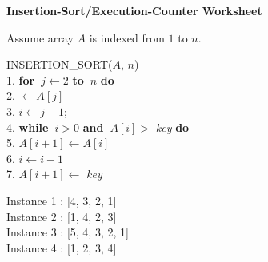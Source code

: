\documentclass[12pt]{article}
\begin{document}
\newcommand{\I}{\mbox{{\em Int}}}
\newcommand{\lt}{\mbox{{\em left}}}
\newcommand{\rt}{\mbox{{\em right}}}
\newcommand{\ld}{\Delta^l}
\newcommand{\rd}{\Delta^r}
\newcommand{\lsp}[1]{\large\renewcommand{\baselinestretch}{#1}\normalsize}
\newcommand{\hsp}{\hspace{.2in}}

\def\Endwhile{\mbox{\bf endwhile\ }}
\def\Or{\mbox{\bf or\ }}
\def\Do{\mbox{\bf do\ }}
\def\Downto{\mbox{\bf downto\ }}
\def\Int{\mbox{\bf int\ }}
\def\To{\mbox{\bf to\ }}
\def\Repeat{\mbox{\bf repeat\ }}
\def\Until{\mbox{\bf until\ }}
\def\Return{\mbox{\bf return\ }}
\def\Not{\mbox{\bf not\ }}
\def\And{\mbox{\bf and\ }}
\def\For{\mbox{\bf for\ }}
\def\Foreach{\mbox{\bf foreach\ }}
\def\Else{\mbox{\bf else\ }}
\def\Elseif{\mbox{\bf elseif\ }}
\def\End{\mbox{\bf end\ }}
\def\If{\mbox{\bf if\ }}
\def\Mod{\mbox{\bf \ mod\ }}
\def\Then{\mbox{\bf then\ }}
\def\While{\mbox{\bf while\ }}
\def\Output{\mbox{\bf output\ }}


\lsp{1}
\pagestyle{plain}
\begin{center}
    {\bf
        Insertion-Sort/Execution-Counter Worksheet
    }
\end{center}

Assume array $A$ is indexed from $1$ to $n$.

\noindent
INSERTION\_SORT($A$, $n$)\\
1. \For $j \leftarrow 2$ \To $n$ \Do\\
2. \indent {} $\leftarrow A[j]$\\
3. \indent \indent $i \leftarrow j-1$;\\
4. \indent \indent \While $i > 0$ \And $A[i] >$ {\em key} \Do\\
5. \indent \indent \indent \indent $A[i+1] \leftarrow A[i]$\\
6. \indent \indent \indent \indent $i \leftarrow i-1$\\
7. \indent \indent $A[i+1] \leftarrow$ {\em key}

\vspace*{0.5in}
\noindent
Instance 1 : [4, 3, 2, 1]\\
Instance 2 : [1, 4, 2, 3]\\
Instance 3 : [5, 4, 3, 2, 1]\\
Instance 4 : [1, 2, 3, 4]
\end{document}

